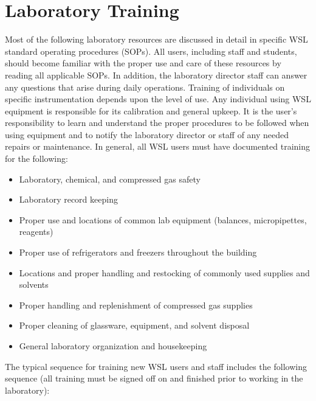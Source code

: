 \section{Laboratory Training}
Most of the following laboratory resources are discussed in detail in specific WSL standard operating procedures (SOPs). All users, including staff and students, should become familiar with the proper use and care of these resources by reading all applicable SOPs. In addition, the laboratory director staff can answer any questions that arise during daily operations. Training of individuals on specific instrumentation depends upon the level of use. Any individual using WSL equipment is responsible for its calibration and general upkeep. It is the user’s responsibility to learn and understand the proper procedures to be followed when using equipment and to notify the laboratory director or staff of any needed repairs or maintenance.\linebreak
In general, all WSL users must have documented training for the following:
\begin{itemize}
	\item Laboratory, chemical, and compressed gas safety 
	\item Laboratory record keeping
	\item Proper use and locations of common lab equipment (balances, micropipettes, reagents)
	\item Proper use of refrigerators and freezers throughout the building
	\item Locations and proper handling and restocking of commonly used supplies and solvents 
	\item Proper handling and replenishment of compressed gas supplies
	\item Proper cleaning of glassware, equipment, and solvent disposal
	\item General laboratory organization and housekeeping
\end{itemize}

The typical sequence for training new WSL users and staff includes the following sequence (all training must be signed off on and finished prior to working in the laboratory):

